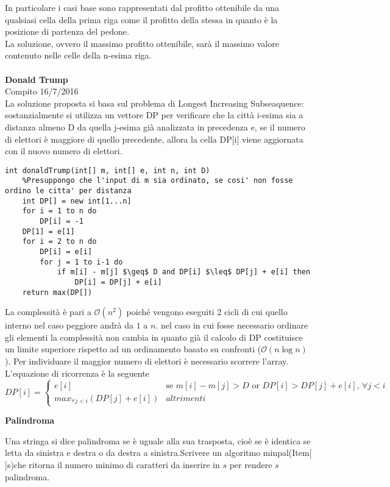 \documentclass[../cheatSheetAlgoritmi.tex]{subfiles}
\begin{document}
In particolare i casi base sono rappresentati dal profitto ottenibile da una qualsiasi cella della prima riga come il profitto della stessa in quanto è la posizione di partenza del pedone.\\
La soluzione, ovvero il massimo profitto ottenibile, sarà il massimo valore contenuto nelle celle della n-esima riga.\\\\
\textbf{Donald Trump}\\
Compito 16/7/2016\\
La soluzione proposta si basa sul problema di Longest Increasing Subseaquence: sostanzialmente si utilizza un vettore DP per verificare che la città i-esima sia a distanza almeno D da quella j-esima già analizzata in precedenza e, se il numero di elettori è maggiore di quello precedente, allora la cella DP[i] viene aggiornata con il nuovo numero di elettori.
\begin{lstlisting}[caption=Donald Trump]
int donaldTrump(int[] m, int[] e, int n, int D)
	%Presuppongo che l'input di m sia ordinato, se cosi' non fosse ordino le citta' per distanza
	int DP[] = new int[1...n]
	for i = 1 to n do
		DP[i] = -1
	DP[1] = e[1]
	for i = 2 to n do
		DP[i] = e[i]
		for j = 1 to i-1 do
			if m[i] - m[j] $\geq$ D and DP[i] $\leq$ DP[j] + e[i] then
				DP[i] = DP[j] + e[i]
	return max(DP[])
\end{lstlisting}
La complessità è pari a $\mathcal{O}(n^{2})$ poiché vengono eseguiti 2 cicli di cui quello interno nel caso peggiore andrà da $1$ a $n$. nel caso in cui fosse necessario ordinare gli elementi la complessità non cambia in quanto già il calcolo di DP costituisce un limite superiore rispetto ad un ordinamento basato su confronti ($\mathcal{O}(n\log{n})$). Per individuare il maggior numero di elettori è necessario scorrere l'array.\\
L'equazione di ricorrenza è la seguente
\begin{equation*}
  	DP[i] =\begin{cases}
    	e[i] & \text{se $m[i] - m[j] > D$ or $DP[i] > DP[j] + e[i]$, $\forall j < i$ }\\
    	max_{\forall j < i} (DP[j] + e[i]) & \text{$altrimenti$}
  	\end{cases}
\end{equation*}
\newpage
\begin{flushleft}
\textbf{Palindroma}
\end{flushleft}
Una stringa si dice palindroma se è uguale alla sua trasposta, cioè se è identica se letta da sinistra e destra o da destra a sinistra.Scrivere un algoritmo minpal(Item[ ]s)che ritorna il numero minimo di caratteri da inserire in $s$ per rendere $s$ palindroma.\\
\end{document}

